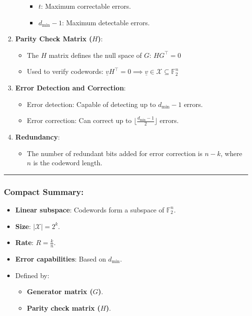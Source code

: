 \documentclass[11pt]{article}
\providecommand{\tightlist}{%
      \setlength{\itemsep}{0pt}\setlength{\parskip}{0pt}}
\begin{document}
\begin{enumerate}
\begin{itemize}
    \begin{itemize}
    \tightlist
    \item
      \(t\): Maximum correctable errors.
    \item
      \(d_\text{min} - 1\): Maximum detectable errors.
    \end{itemize}
  \end{itemize}
\item
  \textbf{Parity Check Matrix (\(H\))}:

  \begin{itemize}
  \tightlist
  \item
    The \(H\) matrix defines the null space of \(G\): \(H G^\top = 0\)
  \item
    Used to verify codewords:
    \(\underline{v} H^\top = 0 \implies \underline{v} \in \mathcal{X} \subseteq \mathbb{F}_2^n\)
  \end{itemize}
\item
  \textbf{Error Detection and Correction}:

  \begin{itemize}
  \tightlist
  \item
    Error detection: Capable of detecting up to \(d_\text{min} - 1\)
    errors.
  \item
    Error correction: Can correct up to
    \(\lfloor \frac{d_\text{min} - 1}{2} \rfloor\) errors.
  \end{itemize}
\item
  \textbf{Redundancy}:

  \begin{itemize}
  \tightlist
  \item
    The number of redundant bits added for error correction is
    \(n - k\), where \(n\) is the codeword length.
  \end{itemize}
\end{enumerate}

\begin{center}\rule{0.5\linewidth}{0.5pt}\end{center}

\subsubsection{Compact Summary:}\label{compact-summary}

\begin{itemize}
\tightlist
\item
  \textbf{Linear subspace}: Codewords form a subspace of
  \(\mathbb{F}_2^n\).
\item
  \textbf{Size}: \(|\mathcal{X}| = 2^k\).
\item
  \textbf{Rate}: \(R = \frac{k}{n}\).
\item
  \textbf{Error capabilities}: Based on \(d_\text{min}\).
\item
  Defined by:

  \begin{itemize}
  \tightlist
  \item
    \textbf{Generator matrix (\(G\))}.
  \item
    \textbf{Parity check matrix (\(H\))}.
  \end{itemize}
\end{itemize}
\end{document}
